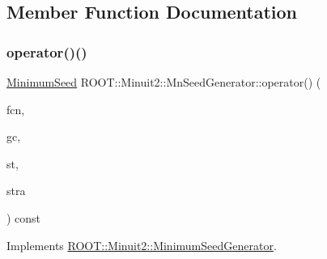 \subsection{Member Function Documentation}
\mbox{\label{classROOT_1_1Minuit2_1_1MnSeedGenerator_a654d0f1b67cd1a3a17de8334ba811ef0}} 
\subsubsection{\texorpdfstring{operator()()}{operator()()}\hspace{0.1cm}{\footnotesize\ttfamily [1/4]}}
{\footnotesize\ttfamily \mbox{\hyperlink{classROOT_1_1Minuit2_1_1MinimumSeed}{Minimum\+Seed}} R\+O\+O\+T\+::\+Minuit2\+::\+Mn\+Seed\+Generator\+::operator() (\begin{DoxyParamCaption}\item[{const \mbox{\hyperlink{classROOT_1_1Minuit2_1_1MnFcn}{Mn\+Fcn}} \&}]{fcn,  }\item[{const \mbox{\hyperlink{classROOT_1_1Minuit2_1_1GradientCalculator}{Gradient\+Calculator}} \&}]{gc,  }\item[{const \mbox{\hyperlink{classROOT_1_1Minuit2_1_1MnUserParameterState}{Mn\+User\+Parameter\+State}} \&}]{st,  }\item[{const \mbox{\hyperlink{classROOT_1_1Minuit2_1_1MnStrategy}{Mn\+Strategy}} \&}]{stra }\end{DoxyParamCaption}) const\hspace{0.3cm}{\ttfamily [virtual]}}



Implements \mbox{\hyperlink{classROOT_1_1Minuit2_1_1MinimumSeedGenerator_ae71de52027d3f0c7fa202c7cf65b947a}{R\+O\+O\+T\+::\+Minuit2\+::\+Minimum\+Seed\+Generator}}.

